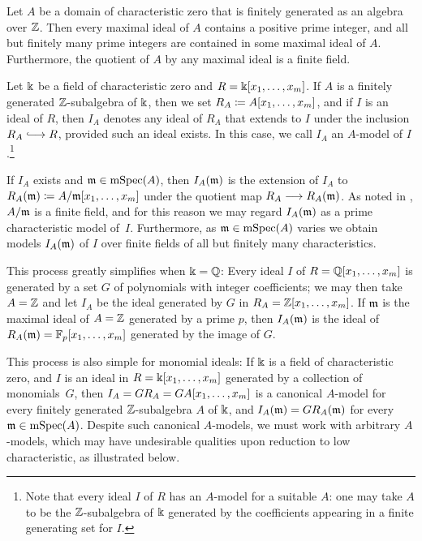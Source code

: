 \documentclass{amsart}
\begin{document}
\begin{remark}
   \label{maximal ideals: R}
   Let $A$ be a domain of characteristic zero that is finitely generated as an algebra over $\mathbb{Z}$.
   Then every maximal ideal of $A$ contains a positive prime integer, and all but finitely many prime integers are contained in some maximal ideal of $A$.
   Furthermore, the quotient of $A$ by any maximal ideal is a finite field.
\end{remark}

\begin{remark}
   \label{reduction: R}
   Let $\Bbbk$ be a field of characteristic zero and $R = \Bbbk[x_1, \ldots, x_m]$.
   If $A$ is a finitely generated $\mathbb{Z}$-subalgebra of $\Bbbk$, then we set $R_A \coloneqq A[x_1, \ldots, x_m]$, and if $I$ is an ideal of $R$, then $I_A$ denotes any ideal of $R_A$ that extends to $I$ under the inclusion $R_A \hooklongrightarrow R$, provided such an ideal exists.
   In this case, we call $I_A$ an $A$-model of $I$.\footnote{Note that every ideal $I$ of $R$ has an $A$-model for a suitable $A$: one may take $A$ to be the $\mathbb{Z}$-subalgebra of $\Bbbk$ generated by the coefficients appearing in a finite generating set for $I$.}

   If $I_A$ exists and $\mathfrak{m} \in \operatorname{mSpec}(A)$, then $I_A(\mathfrak{m})$ is the extension of $I_A$ to $R_{A}(\mathfrak{m}) \coloneqq A/\mathfrak{m}[x_1, \ldots, x_m]$ under the quotient map $R_A \longrightarrow R_A(\mathfrak{m})$.
   As noted in , $A/\mathfrak{m}$ is a finite field, and for this reason we may regard $I_A(\mathfrak{m})$ as a prime characteristic model of~$I$.
   Furthermore, as $\mathfrak{m} \in \operatorname{mSpec}(A)$ varies we obtain models $I_A(\mathfrak{m})$ of $I$ over finite fields of all but finitely many characteristics.
\end{remark}

This process greatly simplifies when $\Bbbk=\mathbb{Q}$: Every ideal $I$ of $R=\mathbb{Q}[x_1, \ldots, x_m]$ is generated by a set $G$ of polynomials with integer coefficients; we may then take $A=\mathbb{Z}$ and let $I_A$ be the ideal generated by $G$ in $R_A=\mathbb{Z}[x_1, \ldots, x_m]$.
If  $\mathfrak{m}$ is the maximal ideal of $A=\mathbb{Z}$ generated by a prime $p$, then $I_A(\mathfrak{m})$ is the ideal of $R_A(\mathfrak{m}) = \mathbb{F}_p[x_1, \ldots, x_m]$  generated by the image of $G$.

This process is also simple for monomial ideals:
If $\Bbbk$ is a field of characteristic zero, and $I$ is an ideal in $R=\Bbbk[x_1, \ldots, x_m]$ generated by a collection of monomials~$G$, then $I_A = GR_A = GA[x_1, \ldots, x_m]$ is a canonical $A$-model for every finitely generated $\mathbb{Z}$-subalgebra $A$ of $\Bbbk$, and $I_A(\mathfrak{m}) = GR_A(\mathfrak{m})$ for every $\mathfrak{m} \in \operatorname{mSpec}(A)$.
Despite such canonical $A$-models, we must work with arbitrary $A$-models, which may have undesirable qualities upon reduction to low characteristic, as illustrated below.
\end{document}
